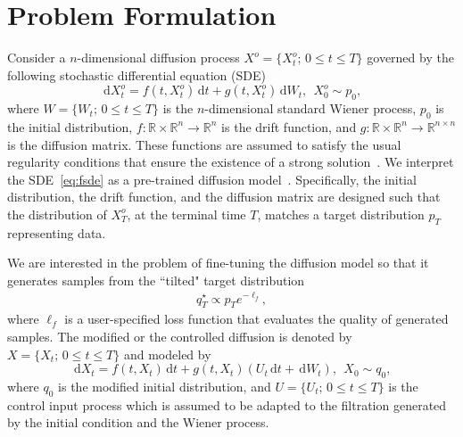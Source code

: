 \documentclass[letterpaper, 10 pt, conference]{ieeeconf}  %
\def\R{\mathbb{R}}
\def\R{\mathbb{R}}
\newcommand{\ud}{\,\mathrm{d}}
\newcommand{\Xo}{X^o}
\begin{document}
\section{Problem Formulation}\label{sec:prob}
Consider a $n$-dimensional diffusion process $\Xo=\{\Xo_t;\,0\leq t\leq T\}$ governed by the following stochastic differential equation (SDE)
\begin{equation}\label{eq:fsde}
    \ud \Xo_t = f(t,\Xo_t) \ud t + g(t,\Xo_t) \ud W_t, ~~\Xo_0 \sim p_0,
\end{equation}
where $W=\{W_t;\,0\leq t\leq T\}$ is the $n$-dimensional standard Wiener process, $p_0$ is the initial distribution, $f: \R \times \R^n \to \R^n$ is the drift function, and $g: \R \times \R^n \to \R^{n\times n}$ is the diffusion matrix.  These functions are assumed to satisfy the usual regularity conditions that ensure the existence of a strong solution~\cite[Thm. 5.2.1]{oksendal2003stochastic}. 
We interpret the SDE~\eqref{eq:fsde} as a pre-trained diffusion model~\cite{songscore2021score}. Specifically, the initial distribution, the drift function, and the diffusion matrix are designed such that the distribution of $\Xo_T$, at the terminal time $T$, matches a target distribution $p_T$ representing data. 

We are interested in the problem of fine-tuning the diffusion model so that it generates samples  from the ``tilted" target distribution 
\begin{align*}
    q^\star_T \propto p_Te^{-\ell_f},
\end{align*}
where $\ell_f$ is a user-specified loss function that evaluates the quality of generated samples.
The modified or the controlled diffusion is denoted by $X=\{X_t;\,0\leq t\leq T\}$ and modeled by 
\begin{equation}\label{eq:fsde-modified}
    \ud X_t = f(t,X_t) \ud t + g(t,X_t) (U_t\ud t + \ud W_t), ~~X_0 \sim q_0,
\end{equation}
where $q_0$ is the modified initial distribution, and $U=\{U_t;\,0\leq t\leq T\}$ is the control input process which is assumed to be adapted to the filtration generated by the initial condition and the Wiener process.  
\end{document}
